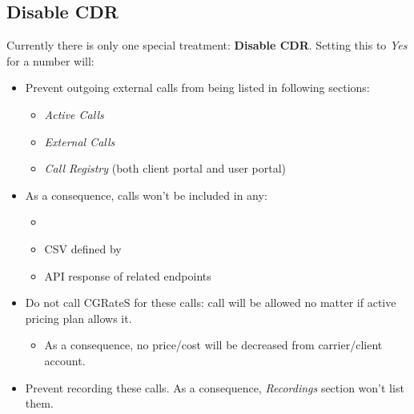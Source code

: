 \documentclass[letterpaper,10pt,english]{sphinxmanual}
\begin{document}
\subsection{Disable CDR}
\label{administration_portal/platform/global_special_numbers:disable-cdr}
Currently there is only one special treatment: \textbf{Disable CDR}. Setting this to \emph{Yes} for a number will:
\begin{itemize}
\item {} 
Prevent outgoing external calls from being listed in following sections:
\begin{itemize}
\item {} 
\emph{Active Calls}

\item {} 
\emph{External Calls}

\item {} 
\emph{Call Registry} (both client portal and user portal)

\end{itemize}

\item {} 
As a consequence, calls won't be included in any:
\begin{itemize}
\item {} 
{\hyperref[administration_portal/brand/invoicing/invoices:invoices]{}}

\item {} 
CSV defined by {\hyperref[administration_portal/client/wholesale/calls/call_csv_schedulers:call\string-csv\string-schedulers]{}}

\item {} 
API response of related endpoints

\end{itemize}

\item {} 
Do not call CGRateS for these calls: call will be allowed no matter if active pricing plan allows it.
\begin{itemize}
\item {} 
As a consequence, no price/cost will be decreased from carrier/client account.

\end{itemize}

\item {} 
Prevent recording these calls. As a consequence, \emph{Recordings} section won't list them.

\end{itemize}
\end{document}
